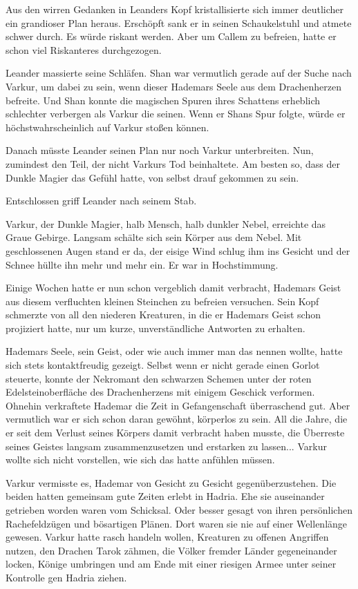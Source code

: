 Aus den wirren Gedanken in Leanders Kopf kristallisierte sich immer deutlicher ein grandioser Plan heraus. Erschöpft sank er in seinen Schaukelstuhl und atmete schwer durch. Es würde riskant werden. Aber um Callem zu befreien, hatte er schon viel Riskanteres durchgezogen.

Leander massierte seine Schläfen. Shan war vermutlich gerade auf der Suche nach Varkur, um dabei zu sein, wenn dieser Hademars Seele aus dem Drachenherzen befreite. Und Shan konnte die magischen Spuren ihres Schattens erheblich schlechter verbergen als Varkur die seinen. Wenn er Shans Spur folgte, würde er höchstwahrscheinlich auf Varkur stoßen können.

Danach müsste Leander seinen Plan nur noch Varkur unterbreiten. Nun, zumindest den Teil, der nicht Varkurs Tod beinhaltete. Am besten so, dass der Dunkle Magier das Gefühl hatte, von selbst drauf gekommen zu sein.

Entschlossen griff Leander nach seinem Stab.



\trennzeichen



Varkur, der Dunkle Magier, halb Mensch, halb dunkler Nebel, erreichte das Graue Gebirge. Langsam schälte sich sein Körper aus dem Nebel. Mit geschlossenen Augen stand er da, der eisige Wind schlug ihm ins Gesicht und der Schnee hüllte ihn mehr und mehr ein. Er war in Hochstimmung.

Einige Wochen hatte er nun schon vergeblich damit verbracht, Hademars Geist aus diesem verfluchten kleinen Steinchen zu befreien versuchen. Sein Kopf schmerzte von all den niederen Kreaturen, in die er Hademars Geist schon projiziert hatte, nur um kurze, unverständliche Antworten zu erhalten.

Hademars Seele, sein Geist, oder wie auch immer man das nennen wollte, hatte sich stets kontaktfreudig gezeigt. Selbst wenn er nicht gerade einen Gorlot steuerte, konnte der Nekromant den schwarzen Schemen unter der roten Edelsteinoberfläche des Drachenherzens mit einigem Geschick verformen. Ohnehin verkraftete Hademar die Zeit in Gefangenschaft überraschend gut. Aber vermutlich war er sich schon daran gewöhnt, körperlos zu sein. All die Jahre, die er seit dem Verlust seines Körpers damit verbracht haben musste, die Überreste seines Geistes langsam zusammenzusetzen und erstarken zu lassen... Varkur wollte sich nicht vorstellen, wie sich das hatte anfühlen müssen.

Varkur vermisste es, Hademar von Gesicht zu Gesicht gegenüberzustehen. Die beiden hatten gemeinsam gute Zeiten erlebt in Hadria. Ehe sie auseinander getrieben worden waren vom Schicksal. Oder besser gesagt von ihren persönlichen Rachefeldzügen und bösartigen Plänen. Dort waren sie nie auf einer Wellenlänge gewesen. Varkur hatte rasch handeln wollen, Kreaturen zu offenen Angriffen nutzen, den Drachen Tarok zähmen, die Völker fremder Länder gegeneinander locken, Könige umbringen und am Ende mit einer riesigen Armee unter seiner Kontrolle gen Hadria ziehen.

